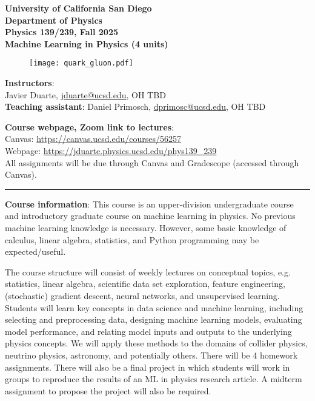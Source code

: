 \documentclass[12pt]{article}
\begin{document}
\begin{center}
	\textbf{University of California San Diego\\
		Department of Physics\\
		Physics 139/239, Fall 2025\\
		Machine Learning in Physics (4 units)}
\end{center}

\begin{figure}[h!]
	\centering
	\texttt{[image: quark\_gluon.pdf]}
\end{figure}

\noindent\textbf{Instructors}:\\
Javier Duarte, \href{mailto:jduarte@ucsd.edu}{jduarte@ucsd.edu}, OH TBD\\
\noindent \textbf{Teaching assistant}: Daniel Primosch, \href{mailto:dprimosc@ucsd.edu}{dprimosc@ucsd.edu}, OH TBD

\noindent\textbf{Course webpage, Zoom link to lectures}:\\
\hspace*{1cm}Canvas: \href{https://canvas.ucsd.edu/courses/56257}{https://canvas.ucsd.edu/courses/56257}\\
\hspace*{1cm}Webpage: \href{https://jduarte.physics.ucsd.edu/phys139\_239}{https://jduarte.physics.ucsd.edu/phys139\_239}\\
\hspace*{1cm}All assignments will be due through Canvas and Gradescope (accessed through Canvas).\\

\begin{center}
	\rule{\textwidth}{0.5pt}
\end{center}

\noindent\textbf{Course information}: This course is an upper-division undergraduate course and introductory graduate course on machine learning in physics.
No previous machine learning knowledge is necessary.
However, some basic knowledge of calculus, linear algebra, statistics, and Python programming may be expected/useful.

The course structure will consist of weekly lectures on conceptual topics, e.g. statistics, linear algebra, scientific data set exploration, feature engineering, (stochastic) gradient descent, neural networks, and unsupervised learning.
Students will learn key concepts in data science and machine learning, including selecting and preprocessing data, designing machine learning models, evaluating model performance, and relating model inputs and outputs to the underlying physics concepts.
We will apply these methods to the domains of collider physics, neutrino physics, astronomy, and potentially others.
There will be 4 homework assignments.
There will also be a final project in which students will work in groups to reproduce the results of an ML in physics research article.
A midterm assignment to propose the project will also be required.
\end{document}
